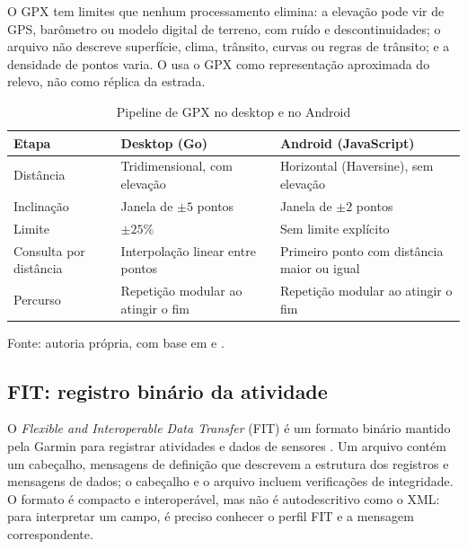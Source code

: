 \enlargethispage{\baselineskip}
O GPX tem limites que nenhum processamento elimina: a elevação pode vir de
GPS, barômetro ou modelo digital de terreno, com ruído e descontinuidades; o
arquivo não descreve superfície, clima, trânsito, curvas ou regras de trânsito;
e a densidade de pontos varia. O \argus{} usa o GPX como representação
aproximada do relevo, não como réplica da estrada.

\begin{table}[H]
    \centering
    \caption{Pipeline de GPX no desktop e no Android}
    \label{tab:gpx-diferencas}
    \small
    \begin{tabular}{@{}>{\raggedright\arraybackslash}p{3.4cm}
        >{\raggedright\arraybackslash}p{5.2cm}
        >{\raggedright\arraybackslash}p{5.2cm}@{}}
        \toprule
        \textbf{Etapa} & \textbf{Desktop (Go)} & \textbf{Android (JavaScript)} \\
        \midrule
        Distância & Tridimensional, com elevação & Horizontal (Haversine), sem
        elevação \\
        Inclinação & Janela de $\pm 5$ pontos & Janela de $\pm 2$ pontos \\
        Limite & $\pm 25\%$ & Sem limite explícito \\
        Consulta por distância & Interpolação linear entre pontos & Primeiro
        ponto com distância maior ou igual \\
        Percurso & Repetição modular ao atingir o fim & Repetição modular ao
        atingir o fim \\
        \bottomrule
    \end{tabular}
    \vspace{0.2cm}
    \par\small Fonte: autoria própria, com base em
     e .
\end{table}

\subsection{FIT: registro binário da atividade}
\label{sec:fit}

O \textit{Flexible and Interoperable Data Transfer} (FIT) é um formato binário
mantido pela Garmin para registrar atividades e dados de sensores
\cite{garmin2024}. Um arquivo contém um cabeçalho, mensagens de definição que
descrevem a estrutura dos registros e mensagens de dados; o cabeçalho e o
arquivo incluem verificações de integridade. O formato é compacto e
interoperável, mas não é autodescritivo como o XML: para interpretar um campo,
é preciso conhecer o perfil FIT e a mensagem correspondente.

